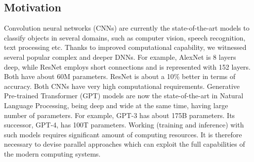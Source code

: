 
\subsection*{Motivation}





Convolution neural networks  (CNNs) are currently the state-of-the-art models to classify objects in several domains, such as computer vision, speech recognition, text processing etc. Thanks to improved computational capability, we witnessed several popular complex and deeper DNNs. For example, AlexNet is 8 layers deep, while ResNet employs short connections and is represented with 152 layers. Both have about 60M parameters. ResNet is about a 10\% better in terms of accuracy. Both CNNs have very high computational requirements. Generative Pre-trained Transformer (GPT) models are now the state-of-the-art in Natural Language Processing, being deep and wide at the same time, having large number of parameters. For  example, GPT-3 has about 175B parameters. Its successor, GPT-4, has 100T parameters. Working (training and inference) with such models requires significant amount of computing resources. It is therefore necessary to devise parallel approaches which can exploit the full capabilities of the modern computing systems.    


